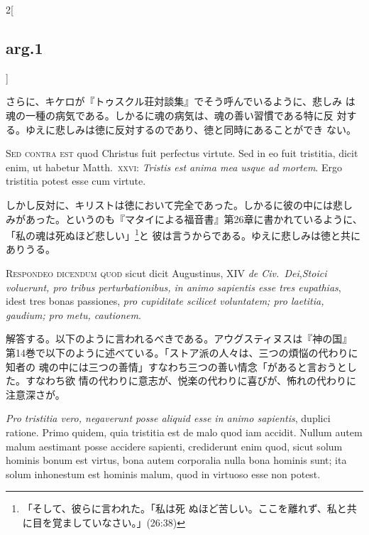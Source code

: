 \documentclass[paper=a4paper,fontsize=10pt,jafontsize=9pt,titlepage]{jlreq}
\begin{document}
\begin{paracol}{2}[\subsection{arg.1}]
\switchcolumn

さらに、キケロが『トゥスクル荘対談集』でそう呼んでいるように、悲しみ
 は魂の一種の病気である。しかるに魂の病気は、魂の善い習慣である特に反
 対する。ゆえに悲しみは徳に反対するのであり、徳と同時にあることができ
 ない。

\switchcolumn*[\subsection{s.c.}]

{\scshape Sed contra est} quod Christus fuit perfectus virtute. Sed in
eo fuit tristitia, dicit enim, ut habetur Matth.~{\scshape xxvi}:
{\itshape Tristis est anima mea usque ad mortem}. Ergo tristitia
potest esse cum virtute.

\switchcolumn

しかし反対に、キリストは徳において完全であった。しかるに彼の中には悲し
みがあった。というのも『マタイによる福音書』第26章に書かれているように、
「私の魂は死ぬほど悲しい」\footnote{「そして、彼らに言われた。「私は死
ぬほど苦しい。ここを離れず、私と共に目を覚ましていなさい。」(26:38)}と
彼は言うからである。ゆえに悲しみは徳と共にありうる。


{\scshape Respondeo dicendum quod} sicut dicit Augustinus, XIV
 {\itshape de Civ.~Dei},{\itshape  Stoici voluerunt, pro tribus
 perturbationibus, in animo sapientis esse tres eupathias}, idest tres
 bonas passiones, {\itshape pro cupiditate scilicet voluntatem; pro laetitia,
 gaudium; pro metu, cautionem}.

\switchcolumn

解答する。以下のように言われるべきである。アウグスティヌスは『神の国』
 第14巻で以下のように述べている。「ストア派の人々は、三つの煩悩の代わりに知者の
 魂の中には三つの善情」すなわち三つの善い情念「があると言おうとした。すなわち欲
 情の代わりに意志が、悦楽の代わりに喜びが、怖れの代わりに注意深さが。

\switchcolumn*

{\itshape Pro tristitia vero, negaverunt posse aliquid esse in animo sapientis},
 duplici ratione. Primo quidem, quia tristitia est de malo quod iam
 accidit. Nullum autem malum aestimant posse accidere sapienti,
 crediderunt enim quod, sicut solum hominis bonum est virtus, bona
 autem corporalia nulla bona hominis sunt; ita solum inhonestum est
 hominis malum, quod in virtuoso esse non potest.


\end{paracol}
\end{document}
